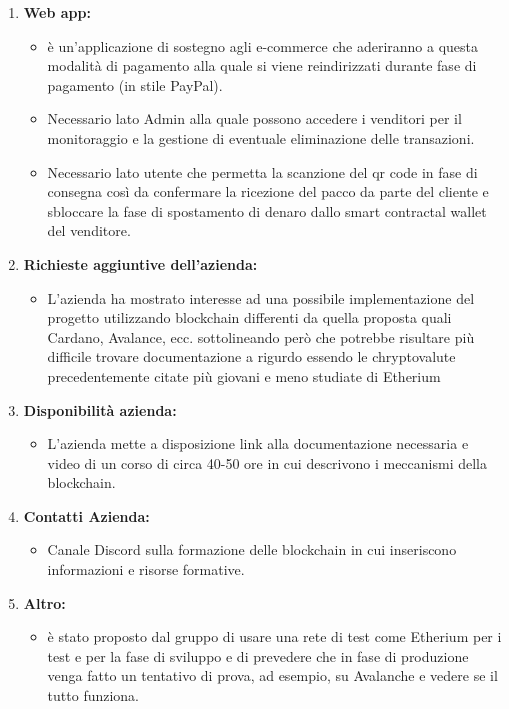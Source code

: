 \begin{enumerate}
	\item \textbf{Web app:}
	\begin{itemize}
		\item è un'applicazione di sostegno agli e-commerce che aderiranno a questa modalità di pagamento alla quale si viene reindirizzati durante fase di pagamento (in stile PayPal).
		\item Necessario lato Admin alla quale possono accedere i venditori per il monitoraggio e la gestione di eventuale eliminazione delle transazioni. 
		\item Necessario lato utente che permetta la scanzione del qr code in fase di consegna così da confermare la ricezione del pacco da parte del cliente e sbloccare la fase di spostamento di denaro dallo smart contract\glo al wallet del venditore.
	\end{itemize}

	\item \textbf{Richieste aggiuntive dell'azienda:}
	\begin{itemize}
		\item L'azienda ha mostrato interesse ad una possibile implementazione del progetto utilizzando blockchain differenti da quella proposta quali Cardano\glo, Avalance\glo, ecc. sottolineando però che potrebbe risultare più difficile trovare documentazione a rigurdo essendo le chryptovalute precedentemente citate più giovani e meno studiate di Etherium\glo
	\end{itemize}

	\item \textbf{Disponibilità azienda:}
	\begin{itemize}
		\item L'azienda mette a disposizione link alla documentazione necessaria e video di un corso di circa 40-50 ore in cui descrivono i meccanismi della blockchain.
		
	\end{itemize}

	\item \textbf{Contatti Azienda:}
	\begin{itemize}
		\item Canale Discord sulla formazione delle blockchain in cui inseriscono informazioni e risorse formative.
	\end{itemize}

	\item \textbf{Altro:}
	\begin{itemize}
		\item è stato proposto dal gruppo di usare una rete di test come Etherium per i test e per la fase di sviluppo e di  prevedere che in fase di produzione venga fatto un tentativo di prova, ad esempio, su Avalanche e vedere se il tutto funziona.
	\end{itemize}

\end{enumerate}

